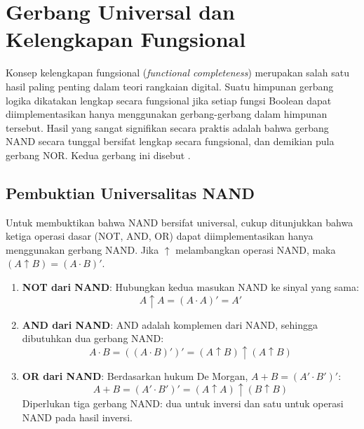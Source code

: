 \section{Gerbang Universal dan Kelengkapan Fungsional}

Konsep kelengkapan fungsional (\textit{functional completeness}) merupakan salah satu hasil paling penting dalam teori rangkaian digital. Suatu himpunan gerbang logika dikatakan lengkap secara fungsional jika setiap fungsi Boolean dapat diimplementasikan hanya menggunakan gerbang-gerbang dalam himpunan tersebut. Hasil yang sangat signifikan secara praktis adalah bahwa gerbang NAND secara tunggal bersifat lengkap secara fungsional, dan demikian pula gerbang NOR. Kedua gerbang ini disebut  \cite{rosen2019}.

\subsection{Pembuktian Universalitas NAND}

Untuk membuktikan bahwa NAND bersifat universal, cukup ditunjukkan bahwa ketiga operasi dasar (NOT, AND, OR) dapat diimplementasikan hanya menggunakan gerbang NAND. Jika $\uparrow$ melambangkan operasi NAND, maka $(A \uparrow B) = (A \cdot B)'$.

\begin{enumerate}[label=\textbf{\arabic*.}]
  \item \textbf{NOT dari NAND}: Hubungkan kedua masukan NAND ke sinyal yang sama:
  \[ A \uparrow A = (A \cdot A)' = A' \]

  \item \textbf{AND dari NAND}: AND adalah komplemen dari NAND, sehingga dibutuhkan dua gerbang NAND:
  \[ A \cdot B = ((A \cdot B)')' = (A \uparrow B) \uparrow (A \uparrow B) \]

  \item \textbf{OR dari NAND}: Berdasarkan hukum De Morgan, $A + B = (A' \cdot B')'$:
  \[ A + B = (A' \cdot B')' = (A \uparrow A) \uparrow (B \uparrow B) \]
  Diperlukan tiga gerbang NAND: dua untuk inversi dan satu untuk operasi NAND pada hasil inversi.
\end{enumerate}

